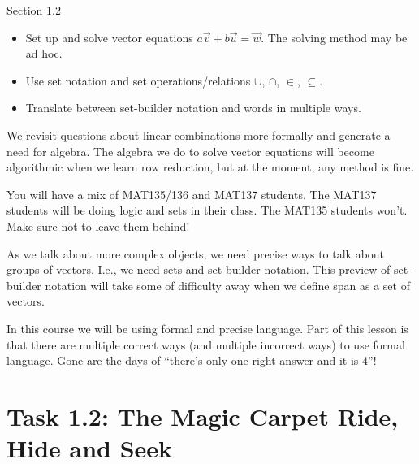 \documentclass{problemset}
\begin{document}
\begin{lesson}

	Section 1.2

	\begin{itemize}
		\item Set up and solve vector equations $a\vec v+b\vec u=\vec w$. The solving
			method may be ad hoc.
		\item Use set notation and set operations/relations $\cup$, $\cap$, $\in$, $\subseteq$.
		\item Translate between set-builder notation and words in multiple ways.
	\end{itemize}

	We revisit questions about linear combinations more formally and generate a need for
	algebra. The algebra we do to solve vector equations will become algorithmic when
	we learn row reduction, but at the moment, any method is fine.

	\begin{annotation}
		\begin{notes}
			You will have a mix of MAT135/136 and MAT137 students.
			The MAT137 students will be doing logic and sets in their
			class. The MAT135 students won't. Make sure not to leave them
			behind!
		\end{notes}
	\end{annotation}
	As we talk about more complex objects, we need precise ways to talk about
	groups of vectors. I.e., we need sets and set-builder notation. This preview of set-builder
	notation will take some of difficulty away when we define span as a set of vectors.

	In this course we will be using formal and precise language. Part of this lesson
	is that there are multiple correct ways (and multiple incorrect ways) to use formal
	language. Gone are the days of ``there's only one right answer and it is 4''!

	\newpage
\end{lesson}

\section*{Task 1.2: The Magic Carpet Ride, Hide and Seek}
\end{document}
